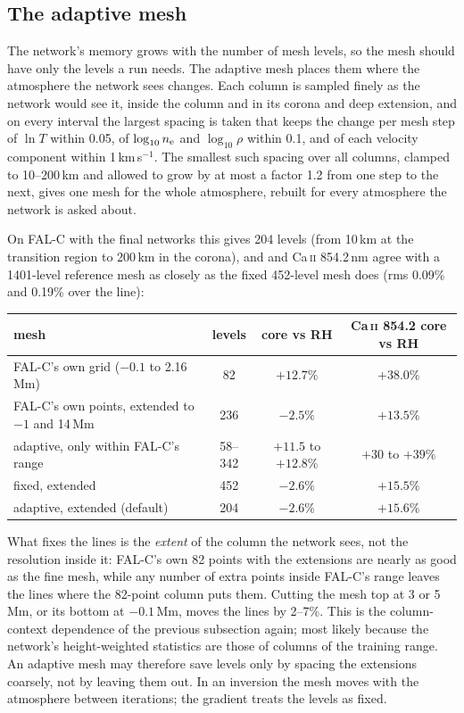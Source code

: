 \subsection{The adaptive mesh}
The network's memory grows with the number of mesh levels, so the mesh should have only the levels a run needs. The adaptive mesh places them where the atmosphere the network sees changes. Each column is sampled finely as the network would see it, inside the column and in its corona and deep extension, and on every interval the largest spacing is taken that keeps the change per mesh step of $\ln T$ within 0.05, of $\log_{10}n_{\rm e}$ and $\log_{10}\rho$ within 0.1, and of each velocity component within 1\,km\,s$^{-1}$. The smallest such spacing over all columns, clamped to 10--200\,km and allowed to grow by at most a factor 1.2 from one step to the next, gives one mesh for the whole atmosphere, rebuilt for every atmosphere the network is asked about.

On FAL-C with the final networks this gives 204 levels (from 10\,km at the transition region to 200\,km in the corona), and \Halpha{} and Ca\,\textsc{ii} 854.2\,nm agree with a 1401-level reference mesh as closely as the fixed 452-level mesh does (rms 0.09\% and 0.19\% over the line):
\begin{center}\small
\begin{tabular}{lccc}
\toprule
mesh & levels & \Halpha{} core vs RH & Ca\,\textsc{ii} 854.2 core vs RH \\\midrule
FAL-C's own grid ($-0.1$ to 2.16\,Mm) & 82 & $+12.7\%$ & $+38.0\%$ \\
FAL-C's own points, extended to $-1$ and 14\,Mm & 236 & $-2.5\%$ & $+13.5\%$ \\
adaptive, only within FAL-C's range & 58--342 & $+11.5$ to $+12.8\%$ & $+30$ to $+39\%$ \\
fixed, extended & 452 & $-2.6\%$ & $+15.5\%$ \\
adaptive, extended (default) & 204 & $-2.6\%$ & $+15.6\%$ \\\bottomrule
\end{tabular}
\end{center}
What fixes the lines is the \emph{extent} of the column the network sees, not the resolution inside it: FAL-C's own 82 points with the extensions are nearly as good as the fine mesh, while any number of extra points inside FAL-C's range leaves the lines where the 82-point column puts them. Cutting the mesh top at 3 or 5\,Mm, or its bottom at $-0.1$\,Mm, moves the lines by 2--7\%. This is the column-context dependence of the previous subsection again; most likely because the network's height-weighted statistics are those of columns of the training range. An adaptive mesh may therefore save levels only by spacing the extensions coarsely, not by leaving them out. In an inversion the mesh moves with the atmosphere between iterations; the gradient treats the levels as fixed.

